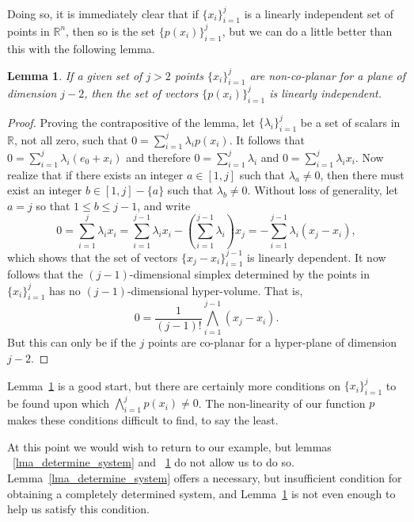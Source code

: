 \documentclass{birkjour}
\newtheorem{lem}[thm]{Lemma}
\theoremstyle{definition}
\theoremstyle{remark}
\numberwithin{equation}{section}
\newcommand{\R}{\mathbb{R}}
\begin{document}
Doing so, it is immediately clear that if $\{x_i\}_{i=1}^j$ is a linearly independent
set of points in $\R^n$, then so is the set $\{p(x_i)\}_{i=1}^j$, but we can do
a little better than this with the following lemma.
\begin{lem}\label{lma_non_co_planar}
If a given set of $j>2$ points $\{x_i\}_{i=1}^j$ are non-co-planar for a plane of
dimension $j-2$, then the set of vectors $\{p(x_i)\}_{i=1}^j$ is linearly independent.
\end{lem}
\begin{proof}
Proving the contrapositive of the lemma, let $\{\lambda_i\}_{i=1}^j$ be
a set of scalars in $\R$, not all zero, such that $0=\sum_{i=1}^j\lambda_i p(x_i)$.
It follows that $0=\sum_{i=1}^j\lambda_i(e_0+x_i)$ and therefore
$0=\sum_{i=1}^j\lambda_i$ and $0=\sum_{i=1}^j\lambda_i x_i$.
Now realize that if there exists an integer $a\in[1,j]$ such that $\lambda_a\neq 0$,
then there must exist an integer $b\in[1,j]-\{a\}$ such that $\lambda_b\neq 0$.
Without loss of generality, let $a=j$ so that $1\leq b\leq j-1$, and write
\begin{equation*}
0 = \sum_{i=1}^j\lambda_ix_i = \sum_{i=1}^{j-1}\lambda_ix_i - \left(\sum_{i=1}^{j-1}\lambda_i\right)x_j = -\sum_{i=1}^{j-1}\lambda_i(x_j-x_i),
\end{equation*}
which shows that the set of vectors $\{x_j-x_i\}_{i=1}^{j-1}$ is linearly dependent.
It now follows that the $(j-1)$-dimensional simplex determined by the points in $\{x_i\}_{i=1}^j$
has no $(j-1)$-dimensional hyper-volume.  That is,
\begin{equation*}
0 = \frac{1}{(j-1)!}\bigwedge_{i=1}^{j-1}(x_j-x_i).
\end{equation*}
But this can only be if the $j$ points are co-planar for a hyper-plane of dimension $j-2$.
\end{proof}

Lemma~\ref{lma_non_co_planar} is a good start, but there are certainly more conditions on $\{x_i\}_{i=1}^j$ to be found upon which
$\bigwedge_{i=1}^j p(x_i)\neq 0$.  The non-linearity of our function $p$ makes these conditions difficult to find, to say the least.

At this point we would wish to return to our example, but
lemmas ~\ref{lma_determine_system} and ~\ref{lma_non_co_planar} do
not allow us to do so.  Lemma~\ref{lma_determine_system} offers a
necessary, but insufficient condition for obtaining a completely determined system,
and Lemma~\ref{lma_non_co_planar} is not even enough to help us satisfy this condition.
\end{document}

